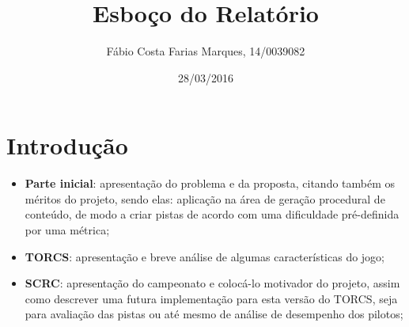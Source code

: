 \documentclass{article}
\title{Esboço do Relatório}
\author{Fábio Costa Farias Marques, 14/0039082}
\date{28/03/2016}
\begin{document}
\maketitle
\section{Introdução}
	\begin{itemize}
		\item \textbf{Parte inicial}: apresentação do problema e da proposta, citando também os méritos do projeto, sendo elas:  aplicação na área de geração procedural de conteúdo, de modo a criar pistas de acordo com uma dificuldade pré-definida por uma métrica;
		\item \textbf{TORCS}\cite{TORCS}: apresentação e breve análise de algumas características do jogo;
		\item \textbf{SCRC}: apresentação do campeonato e colocá-lo motivador do projeto, assim como descrever uma futura implementação para esta versão do TORCS, seja para avaliação das pistas ou até mesmo de análise de desempenho dos pilotos; 
	\end{itemize}
\end{document}
